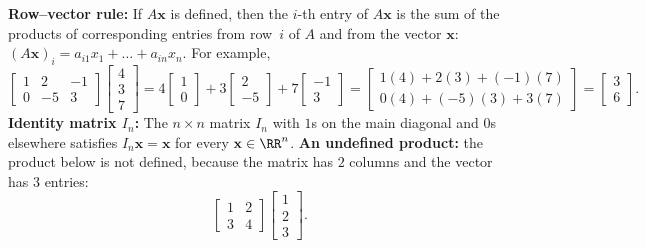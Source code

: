 \documentclass[10pt]{scrartcl}
\newcommand{\vv}[1]{\mathbf{#1}}
\begin{document}
\begin{itemize}
  \ii \textbf{Row--vector rule:} If $A\vv x$ is defined, then the $i$-th entry of $A\vv x$ is the sum of the products of corresponding entries from row~$i$ of $A$ and from the vector $\vv x$: $(A\vv x)_i=a_{i1}x_1+\dots+a_{in}x_n$. For example,
  \[
    \begin{bmatrix} 1 & 2 & -1 \\ 0 & -5 & 3 \end{bmatrix}\begin{bmatrix} 4 \\ 3 \\ 7 \end{bmatrix}
    = 4\begin{bmatrix} 1 \\ 0 \end{bmatrix} + 3\begin{bmatrix} 2 \\ -5 \end{bmatrix} + 7\begin{bmatrix} -1 \\ 3 \end{bmatrix}
    = \begin{bmatrix} 1(4)+2(3)+(-1)(7) \\ 0(4)+(-5)(3)+3(7) \end{bmatrix}
    = \begin{bmatrix} 3 \\ 6 \end{bmatrix}.
  \]
  \ii \textbf{Identity matrix $I_n$:} The $n\times n$ matrix $I_n$ with $1$s on the main diagonal and $0$s elsewhere satisfies $I_n\vv x=\vv x$ for every $\vv x\in\RR^n$.
  \ii \textbf{An undefined product:} the product below is not defined, because the matrix has $2$ columns and the vector has $3$ entries:
  \[
    \begin{bmatrix}1&2\\3&4\end{bmatrix}\begin{bmatrix}1\\2\\3\end{bmatrix}.
  \]
\end{itemize}
\end{document}
